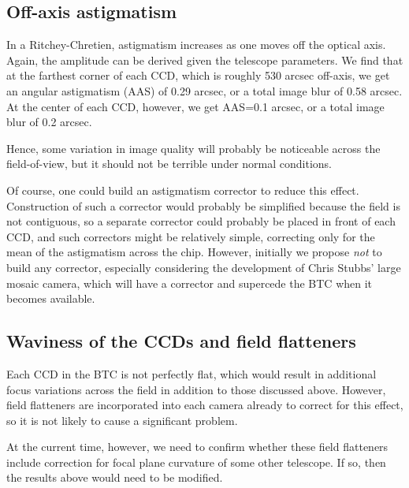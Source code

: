 \documentclass{article}
\begin{document}
\subsection{Off-axis astigmatism}

In a Ritchey-Chretien, astigmatism increases as one moves off the optical
axis. Again, the amplitude can be derived given the telescope parameters.
We find that at the farthest corner of each CCD, which is roughly 530
arcsec off-axis, we get an angular astigmatism (AAS) of 0.29 arcsec, or
a total image blur of 0.58 arcsec. At the center of each CCD, however,
we get AAS=0.1 arcsec, or a total image blur of 0.2 arcsec.

Hence, some variation in image quality will probably be noticeable
across the field-of-view, but it should not be terrible under normal
conditions.

Of course, one could build an astigmatism corrector to reduce this effect.
Construction of such a corrector would probably be simplified because
the field is not contiguous, so a separate corrector could probably
be placed in front of each CCD, and such correctors might be relatively
simple, correcting only for the mean of the astigmatism across the
chip. However, initially we propose \textit{not} to build any corrector,
especially considering the development of Chris Stubbs' large mosaic
camera, which will have a corrector and supercede the BTC when it
becomes available.

\subsection{Waviness of the CCDs and field flatteners}

Each CCD in the BTC is not perfectly flat, which would result in
additional focus variations across the field in addition to
those discussed above. However, field flatteners are incorporated into
each camera already to correct for this effect, so it is not likely
to cause a significant problem.

At the current time, however, we need to confirm whether these field
flatteners include correction for focal plane curvature of some other
telescope. If so, then the results above would need to be modified.


\end{document}
